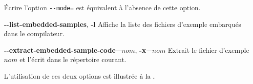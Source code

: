 Écrire l'option \texttt{-{}-mode=} est équivalent à l'absence de cette option.







{\ttfamily\bfseries-{}-list-embedded-samples}, {\ttfamily\bfseries-l} Affiche la liste des fichiers d'exemple embarqués dans le compilateur.

{\ttfamily\bfseries-{}-extract-embedded-sample-code=$nom$}, {\ttfamily\bfseries-x=$nom$} Extrait le fichier d'exemple $nom$ et l'écrit dans le répertoire courant.

L'utilisation de ces deux options est illustrée à la .
